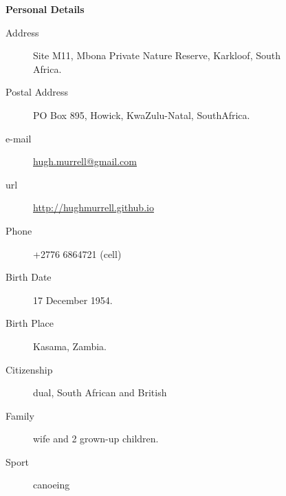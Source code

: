 \begin{description}\item[] \begin{description}\item[] {\large \bf   Personal Details  }
\begin{description}
\item[Address]  Site M11, Mbona Private Nature Reserve, Karkloof, South Africa.
\item[Postal Address] PO Box 895, Howick, KwaZulu-Natal, SouthAfrica.
\item[e-mail]  \url{hugh.murrell@gmail.com}
\item[url]  \url{http://hughmurrell.github.io}
\item[Phone]  +2776 6864721 (cell) 
\item[Birth Date]  17 December 1954.
\item[Birth Place]  Kasama, Zambia.
\item[Citizenship]  dual, South African and British
\item[Family]  wife and 2 grown-up children.
\item[Sport]  canoeing 
\end{description}
\end{description}
\end{description}
\label{f0}
